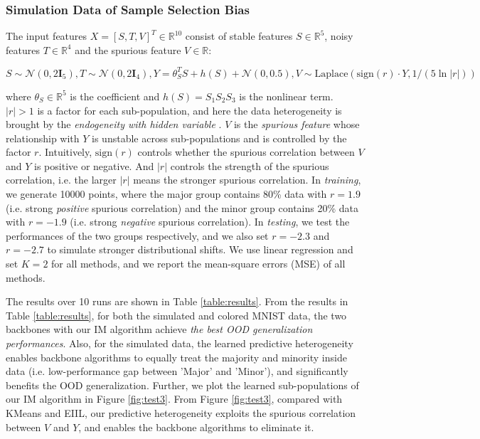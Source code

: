 \subsubsection{Simulation Data of Sample Selection Bias}
The input features $X=[S,T,V]^T\in\mathbb{R}^{10}$ consist of stable features $S\in\mathbb{R}^5$, noisy features $T\in\mathbb{R}^4$ and the spurious feature $V\in\mathbb{R}$:
\begin{small}
\begin{equation}
	S\sim\mathcal{N}(0,2\textbf{I}_5), T\sim\mathcal{N}(0,2\textbf{I}_4), Y=\theta_S^TS + h(S)+\mathcal{N}(0,0.5), V\sim\text{Laplace}(\text{sign}(r)\cdot Y, 1/(5\ln |r|))
\end{equation}	
\end{small}
where $\theta_S\in\mathbb{R}^5$ is the coefficient and $h(S)=S_1S_2S_3$ is the nonlinear term.
$|r|>1$ is a factor for each sub-population, and here the data heterogeneity is brought by the \emph{endogeneity with hidden variable} \citep{fan2014challenges}.
$V$ is the \emph{spurious feature} whose relationship with $Y$ is unstable across sub-populations and is controlled by the factor $r$.
Intuitively, $\text{sign}(r)$ controls whether the spurious correlation between $V$ and $Y$ is positive or negative. 
And $|r|$ controls the strength of the spurious correlation, i.e. the larger $|r|$ means the stronger spurious correlation.
In \emph{training}, we generate 10000 points, where the major group contains 80\% data with $r=1.9$ (i.e. strong \emph{positive} spurious correlation) and the minor group contains 20\% data with $r=-1.9$ (i.e. strong \emph{negative} spurious correlation).
In \emph{testing}, we test the performances of the two groups respectively, and we also set $r=-2.3$ and $r=-2.7$ to simulate stronger distributional shifts.
We use linear regression and set $K=2$ for all methods, and we report the mean-square errors (MSE) of all methods.

The results over 10 runs are shown in Table \ref{table:results}.
From the results in Table \ref{table:results}, for both the simulated and colored MNIST data, the two backbones with our IM algorithm achieve \emph{the best OOD generalization performances}.
Also, for the simulated data, the learned predictive heterogeneity enables backbone algorithms to equally treat the majority and minority inside data (i.e. low-performance gap between 'Major' and 'Minor'), and significantly benefits the OOD generalization.
Further, we plot the learned sub-populations of our IM algorithm in Figure \ref{fig:test3}.
From Figure \ref{fig:test3}, compared with KMeans and EIIL, our predictive heterogeneity exploits the spurious correlation between $V$ and $Y$, and enables the backbone algorithms to eliminate it.


